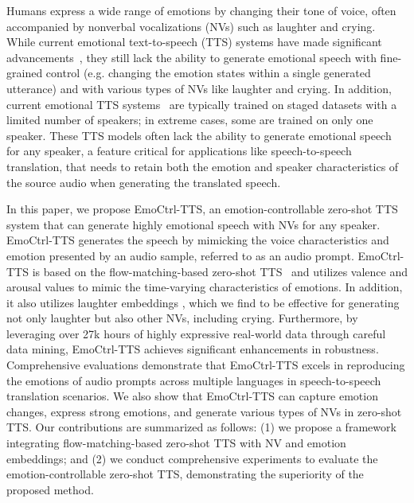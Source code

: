 Humans express a wide range of emotions by changing their tone of voice, often accompanied by nonverbal vocalizations (NVs) such as laughter and crying. While current emotional text-to-speech (TTS) systems have made significant advancements~\cite{zhao2023emotion,tang2024ed,guo2023emodiff,tang2023emomix,zhou2022speech,tang2023qi,lei2022msemotts,shin2022text,lee2017emotional,li2021controllable,cai2021emotion,cho2024emosphere},
they still 
lack the ability to 
generate emotional speech with fine-grained control (e.g. changing the emotion states within a single generated utterance) and with various types of NVs like laughter and crying. 
In addition, current emotional TTS systems~\cite{zhao2023emotion,tang2024ed,guo2023emodiff,tang2023emomix,zhou2022speech,tang2023qi,lei2022msemotts,shin2022text,lee2017emotional,li2021controllable,cai2021emotion,cho2024emosphere} are typically trained on staged datasets with a limited number of speakers; in extreme cases, some are trained on only one speaker. 
These TTS models often lack the ability to generate emotional speech for any speaker, a feature critical for applications like speech-to-speech translation, that needs to retain both the emotion and speaker characteristics of the source audio when generating the translated speech.

In this paper, we propose EmoCtrl-TTS, an emotion-controllable zero-shot TTS system that can generate highly emotional speech with NVs for any speaker. EmoCtrl-TTS generates the speech by mimicking the voice characteristics and emotion presented by an audio sample, referred to as an audio prompt.
EmoCtrl-TTS is based on the flow-matching-based zero-shot TTS~\cite{le2024voicebox} and utilizes valence and arousal values to mimic the time-varying characteristics of emotions.
In addition, it also utilizes laughter embeddings \cite{kanda2024making}, which we find to be effective for generating not only laughter but also other NVs, including crying. 
Furthermore, by leveraging over 27k hours of highly expressive real-world data through careful data mining, EmoCtrl-TTS achieves significant enhancements in robustness.
Comprehensive evaluations demonstrate that EmoCtrl-TTS excels in reproducing the emotions of audio prompts across multiple languages in speech-to-speech translation scenarios. 
We also show that EmoCtrl-TTS can capture emotion changes, express strong emotions, and generate various types of NVs in zero-shot TTS.
Our contributions are summarized as follows: (1) we propose a framework integrating flow-matching-based zero-shot TTS with NV and emotion embeddings; and (2) we conduct comprehensive experiments to evaluate the emotion-controllable zero-shot TTS, demonstrating the superiority of the proposed method.

